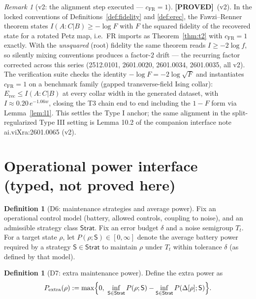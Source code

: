 \documentclass[11pt]{article}
\theoremstyle{definition}
\newtheorem{definition}[theorem]{Definition}
\theoremstyle{remark}
\newtheorem{remark}[theorem]{Remark}
\newcommand{\PROVED}{\textcolor{green!60!black}{\textbf{[PROVED]}}}
\newcommand{\Erec}{E_{\mathrm{rec}}}
\begin{document}
\begin{remark}[v2: the alignment step executed --- $c_{\mathrm{FR}} =
1$]
\label{rem:cfrone}
\PROVED\ (v2). In the locked conventions of
Definitions~\ref{def:fidelity} and \ref{def:erec}, the Fawzi--Renner
theorem \cite{FR} states $I(A : C | B) \ge -\log F$ with $F$ the squared
fidelity of the recovered state for a rotated Petz map, i.e.\ FR imports
as Theorem~\ref{thm:t2} with $c_{\mathrm{FR}} = 1$ exactly. With the
\emph{unsquared} (root) fidelity the same theorem reads $I \ge -2\log
f$, so silently mixing conventions produces a factor-$2$ drift --- the
recurring factor corrected across this series (2512.0101, 2601.0020,
2601.0034, 2601.0035, all v2). The verification suite checks the
identity $-\log F = -2\log\sqrt{F}$ and instantiates $c_{\mathrm{FR}} =
1$ on a benchmark family (gapped transverse-field Ising collar):
$\Erec \le I(A : C | B)$ at every collar width in the generated dataset,
with $I \approx 0.20\, e^{-1.06 w}$, closing the T3 chain end to end
including the $1 - F$ form via Lemma~\ref{lem:l1}. This settles the
Type I anchor; the same alignment in the split-regularized Type III
setting is Lemma 10.2 of the companion interface note
ai.viXra:2601.0065 (v2).
\end{remark}

\section{Operational power interface (typed, not proved here)}

\begin{definition}[D6: maintenance strategies and average power]
\label{def:strat}
Fix an operational control model (battery, allowed controls, coupling to
noise), and an admissible strategy class $\mathsf{Strat}$. Fix an error
budget $\delta$ and a noise semigroup $T_t$. For a target state $\rho$,
let $P(\rho; \mathsf{S}) \in [0, \infty]$ denote the average battery
power required by a strategy $\mathsf{S} \in \mathsf{Strat}$ to maintain
$\rho$ under $T_t$ within tolerance $\delta$ (as defined by that model).
\end{definition}

\begin{definition}[D7: extra maintenance power]
\label{def:pextra}
Define the extra power as
\[
P_{\mathrm{extra}}(\rho) := \max\Bigl\{0,\ \inf_{\mathsf{S} \in
\mathsf{Strat}} P(\rho; \mathsf{S}) - \inf_{\mathsf{S} \in
\mathsf{Strat}} P(\Delta[\rho]; \mathsf{S})\Bigr\}.
\]
\end{definition}
\end{document}
